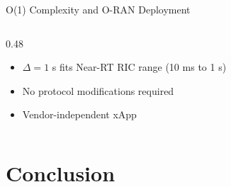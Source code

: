 \documentclass[aspectratio=169,t]{beamer}
\begin{document}
\begin{frame}{O(1) Complexity and O-RAN Deployment}
\begin{columns}[T]
\begin{column}{0.48\textwidth}
      \vspace{2pt}
      {\scriptsize
      \begin{itemize}\setlength\itemsep{1pt}
        \item $\Delta=1$ s fits Near-RT RIC range (10 ms to 1 s)
        \item No protocol modifications required
        \item Vendor-independent xApp
      \end{itemize}}
    \end{column}
  \end{columns}

\end{frame}

\section{Conclusion}
\end{document}
